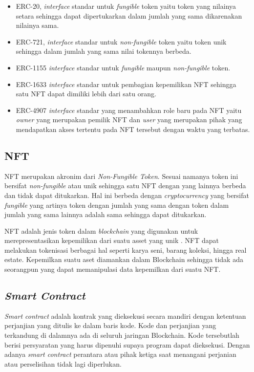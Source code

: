 \begin{itemize}
  \item ERC-20, \emph{interface} standar untuk \emph{fungible} token yaitu token yang nilainya setara sehingga dapat dipertukarkan dalam jumlah yang sama dikarenakan nilainya sama. \parencite{FabianVogelsteller}
  \item ERC-721, \emph{interface} standar untuk \emph{non-fungible} token yaitu token unik sehingga dalam jumlah yang sama nilai tokennya berbeda. \parencite{WilliamEntriken}
  \item ERC-1155 \emph{interface} standar untuk \emph{fungible} maupun \emph{non-fungible} token. \parencite{WitekRadomski}
  \item ERC-1633 \emph{interface} standar untuk pembagian kepemilikan NFT sehingga satu NFT dapat dimiliki lebih dari satu orang. \parencite{BillyRennekamp}
  \item ERC-4907 \emph{interface} standar yang menambahkan role baru pada NFT yaitu \emph{owner} yang merupakan pemilik NFT dan \emph{user} yang merupakan pihak yang mendapatkan akses tertentu pada NFT tersebut dengan waktu yang terbatas. \parencite{Anders}
\end{itemize}

\subsection{NFT}
NFT merupakan akronim dari \emph{Non-Fungible Token}. Sesuai namanya token ini bersifat \emph{non-fungible} atau unik sehingga satu NFT dengan yang lainnya berbeda dan tidak dapat ditukarkan. Hal ini berbeda dengan \emph{cryptocurrency} yang bersifat \emph{fungible} yang artinya token dengan jumlah yang sama dengan token dalam jumlah yang sama lainnya adalah sama sehingga dapat ditukarkan.

NFT adalah jenis token dalam \emph{blockchain} yang digunakan untuk merepresentasikan kepemilikan dari suatu asset yang unik \parencite{NavarroBlazquez}. NFT dapat melakukan tokenisasi berbagai hal seperti karya seni, barang koleksi, hingga real estate. Kepemilkan suatu aset diamankan dalam Blockchain sehingga tidak ada seorangpun yang dapat memanipulasi data kepemilkan dari suatu NFT.

\subsection{\emph{Smart Contract}}
\emph{Smart contract} adalah kontrak yang dieksekusi secara mandiri dengan ketentuan perjanjian yang ditulis ke dalam baris kode. Kode dan perjanjian yang terkandung di dalamnya ada di seluruh jaringan Blockchain. Kode tersebutlah berisi persyaratan yang harus dipenuhi supaya program dapat dieksekusi. Dengan adanya \emph{smart contract} perantara atau pihak ketiga saat menangani perjanian atau perselisihan tidak lagi diperlukan. \parencite{DouglasTjokrostetio}

